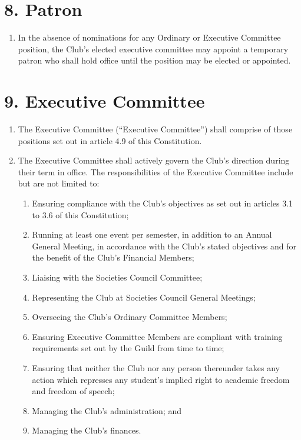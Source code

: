 \documentclass[12pt]{article}
\begin{document}
\section{8. Patron}
\begin{enumerate}[label=8.\arabic*]
 \item In the absence of nominations for any Ordinary or Executive Committee position, the Club’s elected executive committee may appoint a temporary patron who shall hold office until the position may be elected or appointed.
\end{enumerate}
%
\section{9. Executive Committee}
\begin{enumerate}[label=9.\arabic*]
\item The Executive Committee (``Executive Committee'') shall comprise of those positions set out in article 4.9 of this Constitution.
\item The Executive Committee shall actively govern the Club's direction during their term in office. The responsibilities of the Executive Committee include but are not limited to:
    \begin{enumerate}[label=\theenumi.\arabic*]
        \item Ensuring compliance with the Club's objectives as set out in articles 3.1 to 3.6 of this Constitution;
        \item Running at least one event per semester, in addition to an Annual General Meeting, in accordance with the Club's stated objectives and for the benefit of the Club's Financial Members;
        \item Liaising with the Societies Council Committee;
        \item Representing the Club at Societies Council General Meetings;
        \item Overseeing the Club's Ordinary Committee Members;
        \item Ensuring Executive Committee Members are compliant with training requirements set out by the Guild from time to time;
        \item Ensuring that neither the Club nor any person thereunder takes any action which represses any student's implied right to academic freedom and freedom of speech;
        \item Managing the Club's administration; and
        \item Managing the Club's finances.

\end{enumerate}
\end{enumerate}
\end{document}
